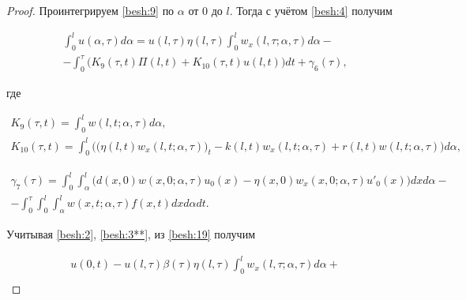 \begin{proof}

Проинтегрируем \eqref{besh:9} по $\alpha$ от 0 до $l$. Тогда с учётом \eqref{besh:4} получим

\begin{multline}

\int^{l}_{0}u(\alpha,\tau)d\alpha=

u(l,\tau)\eta(l,\tau)\int^{l}_{0}w_{x}(l,\tau;\alpha,\tau)d\alpha-

\\

- \int^{\tau}_0\Big(K_{9}(\tau,t)\Pi(l,t)+

K_{10}(\tau,t)u(l,t)\Big)dt+\gamma_{6}(\tau),

\label{besh:19}

\end{multline}

где

\begin{gather*}

K_{9}(\tau,t)=\int^{l}_{0}w(l,t;\alpha,\tau)d\alpha,

\\

K_{10}(\tau,t)=\int^{l}_{0}\Big(\big(\eta(l,t)w_{x}(l,t;\alpha,\tau)\big)_{t}-

k(l,t)w_{x}(l,t;\alpha,\tau)+r(l,t)w(l,t;\alpha,\tau)\Big)d\alpha,

\end{gather*}

\begin{multline*}

\gamma_{7}(\tau)=\int^{l}_{0}\int^{l}_\alpha\Big(d(x, 0)w(x, 0;\alpha,\tau)u_{0}(x)-

\eta(x, 0)w_{x}(x, 0;\alpha,\tau)u'_{0}(x) \Big)dxd\alpha-

\\

-\int^{\tau}_0\int^{l}_{0}

\int^l_{\alpha}w(x,t;\alpha,\tau)f(x,t)dxd\alpha dt.

\end{multline*}

Учитывая \eqref{besh:2}, \eqref{besh:3**}, из \eqref{besh:19} получим

\begin{multline}

u(0,t)-u(l,\tau)\beta(\tau)\eta(l,\tau)\int^{l}_{0}w_{x}(l,\tau;\alpha,\tau)d\alpha+

\\


\end{multline}
\end{proof}
